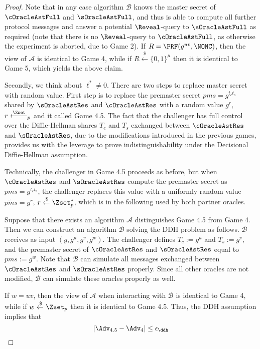 \begin{proof}
 Note that in any case algorithm $\mathcal{B}$ knows the master secret of $\cOracleAstFull$ and $\sOracleAstFull$, and thus is able to compute all further protocol messages and answer a potential $\Reveal$-query to $\sOracleAstFull$ as required (note that there is no $\Reveal$-query to $\cOracleAstFull$, as otherwise the experiment is aborted, due to Game 2). If $R = \PRF(g^{uv},\NONC)$, then the view of $\mathcal{A}$ is identical to Game 4, while if $R \xleftarrow{\$} \{0,1\}^{\mu}$ then it is identical to Game 5, which yields the above claim.

 Secondly, we think about $\ell^{\ast} \neq 0$.
 There are two steps to replace master secret with random value.
 First step is to replace the premaster secret $pms = g^{t_ct_s}$ shared by $\sOracleAstRes$ and $\cOracleAstRes$ with a random value $g^r$, $r \xleftarrow \Zset_p$ and it called Game 4.5. The fact that the challenger has full control over the Diffie-Hellman shares $T_c$ and $T_s$ exchanged between $\cOracleAstRes$ and $\sOracleAstRes$, due to the modifications introduced in the previous games, provides us with the leverage to prove indistinguishability under the Decisional Diffie-Hellman assumption.

 Technically, the challenger in Game 4.5 proceeds as before, but when $\cOracleAstRes$ and $\sOracleAstRes$ compute the premaster secret as $pms = g^{t_ct_s}$, the challenger replaces this value with a uniformly random value $\widetilde{pms} = g^r$, $r \xleftarrow{\$} \Zset^{\ast}_p$, which is in the following used by both partner oracles.

 Suppose that there exists an algorithm $\mathcal{A}$ distinguishes Game 4.5 from Game 4. Then we can construct an algorithm $\mathcal{B}$ solving the DDH problem as follows. $\mathcal{B}$ receives as input $(g,g^u,g^v,g^w)$. The challenger defines $T_c := g^u$ and $T_s := g^v$, and the premaster secret of $\cOracleAstRes$ and $\sOracleAstRes$ equal to $pms := g^w$. Note that $\mathcal{B}$ can simulate all messages exchanged between $\cOracleAstRes$ and $\sOracleAstRes$ properly. Since all other oracles are not modified, $\mathcal{B}$ can simulate these oracles properly as well.

 If $w=uv$, then the view of $\mathcal{A}$ when interacting with $\mathcal{B}$ is identical to Game 4, while if $w \xleftarrow{\$}\Zset_p$ then it is identical to Game 4.5. Thus, the DDH assumption implies that
 \begin{equation}
  |\Adv_{4.5} - \Adv_4| \leq \epsilon_{\ddh}
 \end{equation}%


\end{proof}
